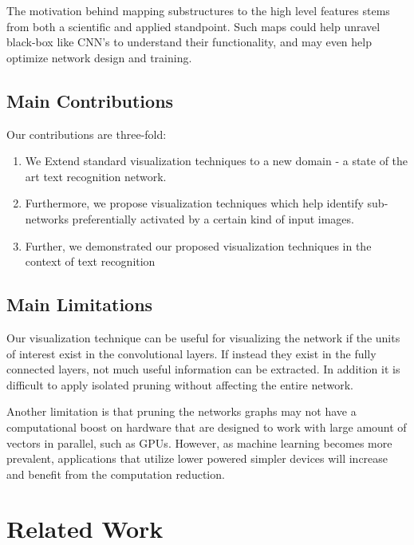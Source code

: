 \documentclass[10pt,twocolumn,letterpaper]{article}
\begin{document}
The motivation behind mapping substructures to the high level features stems from both a scientific and applied standpoint. Such maps could help unravel black-box like CNN's to understand their functionality, and may even help optimize network design and training.


\subsection{Main Contributions}
Our contributions are three-fold:
\begin{enumerate}
\item We Extend standard visualization techniques to a new domain - a state of the art text recognition network.


\item Furthermore, we propose visualization techniques which help identify sub-networks preferentially activated by a certain kind of input images.


\item Further, we demonstrated our proposed visualization techniques in the context of text recognition
\end{enumerate}


\subsection{Main Limitations}
Our visualization technique can be useful for visualizing the network if the units of interest exist in the convolutional layers. If instead they exist in the fully connected layers, not much useful information can be extracted. In addition it is difficult to apply isolated pruning without affecting the entire network.


Another limitation is that pruning the networks graphs may not have a computational boost on hardware that are designed to work with large amount of vectors in parallel, such as GPUs. However, as machine learning becomes more prevalent, applications that utilize lower powered simpler devices will increase and benefit from the computation reduction.


\section{Related Work}
\end{document}
